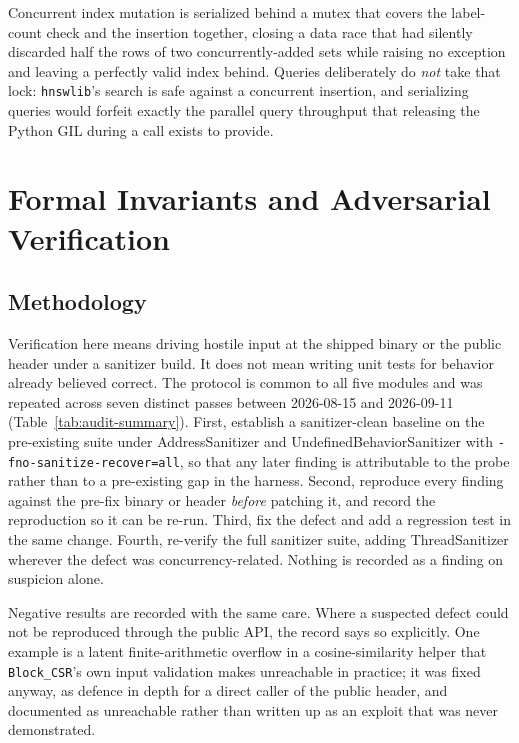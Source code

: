\documentclass[10pt,twocolumn]{article}
\begin{document}
Concurrent index mutation is serialized behind a mutex that covers the
label-count check and the insertion together, closing a data race that had
silently discarded half the rows of two concurrently-added sets while raising
no exception and leaving a perfectly valid index behind. Queries deliberately
do \emph{not} take that lock: \texttt{hnswlib}'s search is safe against a
concurrent insertion, and serializing queries would forfeit exactly the
parallel query throughput that releasing the Python GIL during a call exists
to provide.

\section{Formal Invariants and Adversarial Verification}
\label{sec:verification}



\subsection{Methodology}

Verification here means driving hostile input at the shipped binary or the
public header under a sanitizer build. It does not mean writing unit tests
for behavior already believed correct. The protocol is common to all five
modules and was repeated across seven distinct passes between 2026-08-15 and
2026-09-11 (Table~\ref{tab:audit-summary}). First, establish a
sanitizer-clean baseline on the pre-existing suite under AddressSanitizer and
UndefinedBehaviorSanitizer with \texttt{-fno-sanitize-recover=all}, so that
any later finding is attributable to the probe rather than to a pre-existing
gap in the harness. Second, reproduce every finding against the pre-fix
binary or header \emph{before} patching it, and record the reproduction so it
can be re-run. Third, fix the defect and add a regression test in the same
change. Fourth, re-verify the full sanitizer suite, adding ThreadSanitizer
wherever the defect was concurrency-related. Nothing is recorded as a finding
on suspicion alone.

Negative results are recorded with the same care. Where a suspected defect
could not be reproduced through the public API, the record says so
explicitly. One example is a latent finite-arithmetic overflow in a
cosine-similarity helper that \texttt{Block\_CSR}'s own input validation makes
unreachable in practice; it was fixed anyway, as defence in depth for a direct
caller of the public header, and documented as unreachable rather than
written up as an exploit that was never demonstrated.
\end{document}
